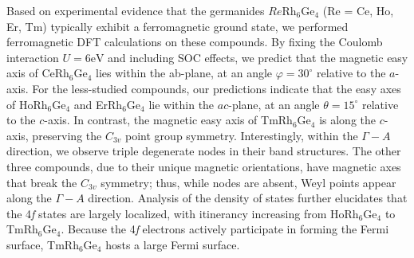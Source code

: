 \documentclass[preprint,12pt]{elsarticle}
\begin{document}

	Based on experimental evidence that the germanides $Re$Rh$_6$Ge$_4$ (Re = Ce, Ho, Er, Tm) typically exhibit a ferromagnetic ground state, we performed ferromagnetic DFT calculations on these compounds. By fixing the Coulomb interaction $U=6 \mathrm{eV}$ and including SOC effects, we predict that the magnetic easy axis of CeRh$_6$Ge$_4$ lies within the ab-plane, at an angle $\varphi=30^{\circ}$ relative to the $a$-axis. For the less-studied compounds, our predictions indicate that the easy axes of HoRh$_6$Ge$_4$ and ErRh$_6$Ge$_4$ lie within the $ac$-plane, at an angle $\theta=15^{\circ}$ relative to the $c$-axis. In contrast, the magnetic easy axis of TmRh$_6$Ge$_4$ is along the $c$-axis, preserving the $C_{3v}$ point group symmetry. Interestingly, within the $\Gamma-A$ direction, we observe triple degenerate nodes in their band structures. The other three compounds, due to their unique magnetic orientations, have magnetic axes that break the $C_{3v}$ symmetry; thus, while nodes are absent, Weyl points appear along the $\Gamma-A$ direction. Analysis of the density of states further elucidates that the 4\textit{f} states are largely localized, with itinerancy increasing from HoRh$_6$Ge$_4$ to TmRh$_6$Ge$_4$. Because the 4\textit{f} electrons actively participate in forming the Fermi surface, TmRh$_6$Ge$_4$ hosts a large Fermi surface.
\end{document}
